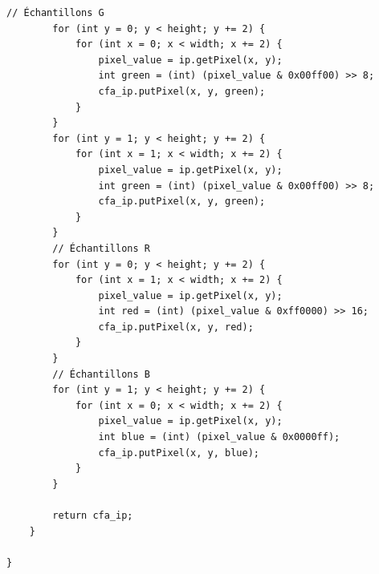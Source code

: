 \documentclass[a4paper,11pt]{article}
\begin{document}
\begin{lstlisting}[caption=Code du premier exercie]
		// Échantillons G
		for (int y = 0; y < height; y += 2) {
			for (int x = 0; x < width; x += 2) {
				pixel_value = ip.getPixel(x, y);
				int green = (int) (pixel_value & 0x00ff00) >> 8;
				cfa_ip.putPixel(x, y, green);
			}
		}
		for (int y = 1; y < height; y += 2) {
			for (int x = 1; x < width; x += 2) {
				pixel_value = ip.getPixel(x, y);
				int green = (int) (pixel_value & 0x00ff00) >> 8;
				cfa_ip.putPixel(x, y, green);
			}
		}
		// Échantillons R
		for (int y = 0; y < height; y += 2) {
			for (int x = 1; x < width; x += 2) {
				pixel_value = ip.getPixel(x, y);
				int red = (int) (pixel_value & 0xff0000) >> 16;
				cfa_ip.putPixel(x, y, red);
			}
		}
		// Échantillons B
		for (int y = 1; y < height; y += 2) {
			for (int x = 0; x < width; x += 2) {
				pixel_value = ip.getPixel(x, y);
				int blue = (int) (pixel_value & 0x0000ff);
				cfa_ip.putPixel(x, y, blue);
			}
		}

		return cfa_ip;
	}

}
  \end{lstlisting}
\end{document}
